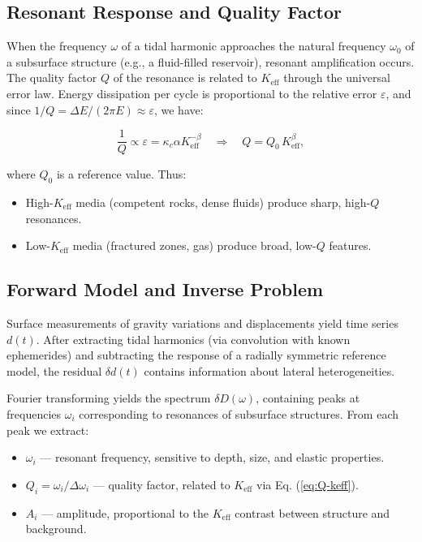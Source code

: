 \documentclass[12pt,a4paper]{article}
\theoremstyle{remark}
\newcommand{\Keff}{K_{\mathrm{eff}}}
\newcommand{\kappac}{\kappa_c}
\newcommand{\eps}{\varepsilon}
\begin{document}
	\subsection{Resonant Response and Quality Factor}
	
	When the frequency $\omega$ of a tidal harmonic approaches the natural frequency $\omega_0$ of a subsurface structure (e.g., a fluid-filled reservoir), resonant amplification occurs. The quality factor $Q$ of the resonance is related to $\Keff$ through the universal error law. Energy dissipation per cycle is proportional to the relative error $\eps$, and since $1/Q = \Delta E / (2\pi E) \approx \eps$, we have:
	
	\begin{equation}
		\frac{1}{Q} \propto \eps = \kappac \alpha \Keff^{-\beta} \quad \Longrightarrow \quad Q = Q_0 \, \Keff^{\beta},
		\label{eq:Q-keff}
	\end{equation}
	
	where $Q_0$ is a reference value. Thus:
	\begin{itemize}
		\item High-$\Keff$ media (competent rocks, dense fluids) produce sharp, high-$Q$ resonances.
		\item Low-$\Keff$ media (fractured zones, gas) produce broad, low-$Q$ features.
	\end{itemize}
	
	\subsection{Forward Model and Inverse Problem}
	
	Surface measurements of gravity variations and displacements yield time series $d(t)$. After extracting tidal harmonics (via convolution with known ephemerides) and subtracting the response of a radially symmetric reference model, the residual $\delta d(t)$ contains information about lateral heterogeneities.
	
	Fourier transforming yields the spectrum $\delta D(\omega)$, containing peaks at frequencies $\omega_i$ corresponding to resonances of subsurface structures. From each peak we extract:
	
	\begin{itemize}
		\item $\omega_i$ — resonant frequency, sensitive to depth, size, and elastic properties.
		\item $Q_i = \omega_i / \Delta \omega_i$ — quality factor, related to $\Keff$ via Eq. (\ref{eq:Q-keff}).
		\item $A_i$ — amplitude, proportional to the $\Keff$ contrast between structure and background.
	\end{itemize}
	
\end{document}
